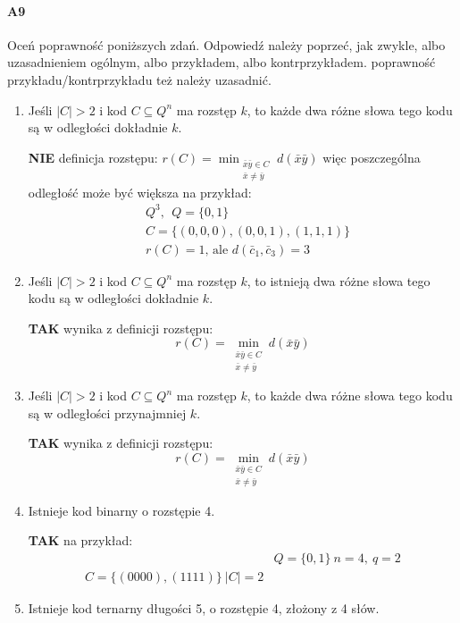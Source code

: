 \paragraph{A9} Oceń poprawność poniższych zdań. Odpowiedź należy poprzeć, jak zwykle, albo uzasadnieniem ogólnym, albo przykładem, albo kontrprzykładem. poprawność przykładu/kontrprzykładu też należy uzasadnić.
\begin{enumerate}[label=\alph*)]
\item Jeśli $|C| > 2$ i kod $C \subseteq Q^n$ ma rozstęp $k$, to każde dwa różne słowa tego kodu są w odległości dokładnie $k$.

\textbf{NIE} definicja rozstępu: $r(C)=\min _{\begin{matrix}
\bar{x}\bar{y}\in C\\
\bar{x}\neq\bar{y}
\end{matrix}}d(\bar{x}\bar{y})$ więc poszczególna odległość może być większa na przykład:
\begin{align*}
&Q^3,\ \ Q=\{0,1\}\\
&C=\{(0,0,0),(0,0,1),(1,1,1)\}\\
&r(C)=1\text{, ale }d(\bar{c}_1,\bar{c}_3)=3
\end{align*}
\item Jeśli $|C| > 2$ i kod $C \subseteq Q^n$ ma rozstęp $k$, to istnieją dwa różne słowa tego kodu są w odległości dokładnie $k$.

\textbf{TAK} wynika z definicji rozstępu:
$$r(C)=\min _{\begin{matrix}
\bar{x}\bar{y}\in C\\
\bar{x}\neq\bar{y}
\end{matrix}}d(\bar{x}\bar{y})$$
\item Jeśli $|C| > 2$ i kod $C \subseteq Q^n$ ma rozstęp $k$, to każde dwa różne słowa tego kodu są w odległości przynajmniej $k$.

\textbf{TAK} wynika z definicji rozstępu:
$$r(C)=\min _{\begin{matrix}
\bar{x}\bar{y}\in C\\
\bar{x}\neq\bar{y}
\end{matrix}}d(\bar{x}\bar{y})$$
\item Istnieje kod binarny o rozstępie 4.

\textbf{TAK} na przykład:
\begin{align}
&Q=\{0,1\}\ n=4,\ q=2\\
C=\{(0000),(1111)\}\ |C|=2
\end{align}
\item Istnieje kod ternarny długości 5, o rozstępie 4, złożony z 4 słów.


\end{enumerate}
